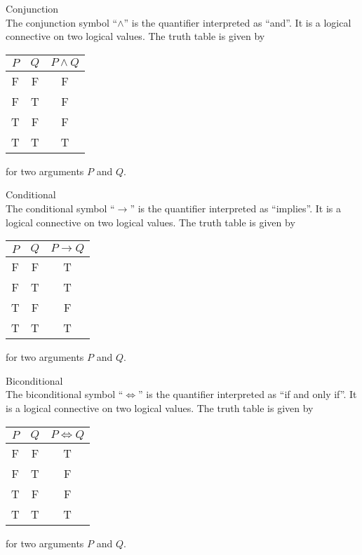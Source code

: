 \documentclass[a4paper]{article}
\begin{document}
\begin{defn}{Conjunction}{}\\
The conjunction symbol ``$\wedge$'' is the quantifier interpreted as ``and''. It is a logical connective on two logical values. The truth table is given by 
\begin{center}
\begin{tabular}{c|c|c}
$P$ & $Q$ & $P\wedge Q$ \\ \hline
F   & F   & F        \\
F   & T   & F        \\
T   & F   & F        \\
T   & T   & T       
\end{tabular}
\end{center}
for two arguments $P$ and $Q$. 
\end{defn}

\begin{defn}{Conditional}{}\\
The conditional symbol ``$\to$'' is the quantifier interpreted as ``implies''. It is a logical connective on two logical values. The truth table is given by 
\begin{center}
\begin{tabular}{c|c|c}
$P$ & $Q$ & $P\to Q$ \\ \hline
F   & F   & T        \\
F   & T   & T        \\
T   & F   & F        \\
T   & T   & T       
\end{tabular}
\end{center}
for two arguments $P$ and $Q$. 
\end{defn}

\begin{defn}{Biconditional}{}\\
The biconditional symbol ``$\iff$'' is the quantifier interpreted as ``if and only if''. It is a logical connective on two logical values. The truth table is given by 
\begin{center}
\begin{tabular}{c|c|c}
$P$ & $Q$ & $P\iff Q$ \\ \hline
F   & F   & T        \\
F   & T   & F        \\
T   & F   & F        \\
T   & T   & T       
\end{tabular}
\end{center}
for two arguments $P$ and $Q$. 
\end{defn}
\end{document}
